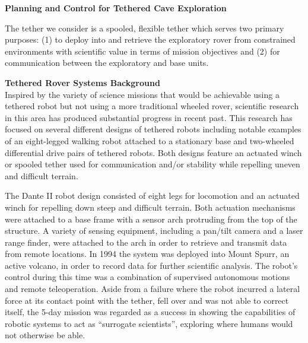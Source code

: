 \documentclass[12pt]{article}
\begin{document}
\newpage

\begin{center}
{\bf Planning and Control for Tethered Cave Exploration }

\end{center}


The tether we consider is a spooled, flexible tether which serves two primary purposes: (1) to deploy into and retrieve the exploratory rover from constrained environments with scientific value in terms of mission objectives and (2) for communication between the exploratory and base units.


{\bf Tethered Rover Systems Background \\}
Inspired by the variety of science missions that would be achievable
using a tethered robot but not using a more traditional wheeled rover, 
scientific research in this area has produced substantial progress in 
recent past. This research has focused on several different designs of
tethered robots including notable examples of an eight-legged walking robot attached to a 
stationary base and two-wheeled differential drive pairs of tethered robots. Both designs
feature an actuated winch or spooled tether used for communication and/or 
stability while repelling uneven and difficult terrain.

The Dante II robot design consisted of eight legs for locomotion and an 
actuated winch for repelling down steep and difficult terrain. Both actuation 
mechanisms were attached to 
a base frame with a sensor arch protruding from the top of the structure. A variety of
sensing equipment, including a pan/tilt camera and a laser range finder,
 were attached to the arch in order to retrieve and transmit data from remote
 locations. In 1994 the system was deployed into Mount Spurr, an active volcano, 
 in order to record data for further scientific analysis. The robot's control 
 during this time was a combination of supervised autonomous motions and remote
 teleoperation. Aside from a failure where the robot incurred a lateral force at its contact
point with the tether, fell over and was not able to correct itself,
 the 5-day mission was regarded as a success in showing the capabilities of robotic
 systems to act as ``surrogate scientists'', exploring where humans would not otherwise
 be able. 
\end{document}
